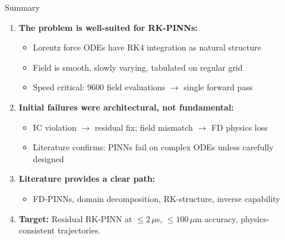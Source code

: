 \documentclass[aspectratio=169, 11pt]{beamer}
\begin{document}
\begin{frame}{Summary}
  \begin{enumerate}\setlength{\itemsep}{3pt}
    \item \textbf{The problem is well-suited for RK-PINNs:}
      \begin{itemize}\setlength{\itemsep}{0pt}
        \item Lorentz force ODEs have RK4 integration as natural structure
        \item Field is smooth, slowly varying, tabulated on regular grid
        \item Speed critical: 9600 field evaluations $\to$ single forward pass
      \end{itemize}

    \item \textbf{Initial failures were architectural, not fundamental:}
      \begin{itemize}\setlength{\itemsep}{0pt}
        \item IC violation $\to$ residual fix; field mismatch $\to$ FD physics loss
        \item Literature confirms: PINNs fail on complex ODEs unless carefully designed
      \end{itemize}

    \item \textbf{Literature provides a clear path:}
      \begin{itemize}\setlength{\itemsep}{0pt}
        \item FD-PINNs, domain decomposition, RK-structure, inverse capability
      \end{itemize}

    \item \textbf{Target:} Residual RK-PINN at $\leq 2$\,$\mu$s, $\leq 100$\,$\mu$m accuracy,
          physics-consistent trajectories.
  \end{enumerate}
\end{frame}
\end{document}
